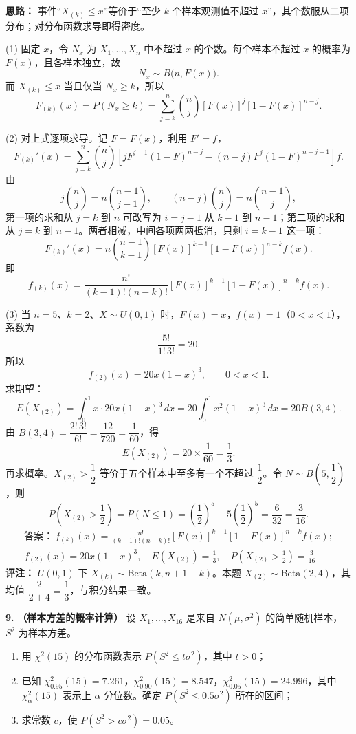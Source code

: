 \ifshowsolutions%
\textbf{思路：} 事件“$X_{(k)}\leq x$”等价于“至少 $k$ 个样本观测值不超过 $x$”，其个数服从二项分布；对分布函数求导即得密度。

(1) 固定 $x$，令 $N_x$ 为 $X_1,\ldots,X_n$ 中不超过 $x$ 的个数。每个样本不超过 $x$ 的概率为 $F(x)$，且各样本独立，故
\[
N_x\sim B\bigl(n,F(x)\bigr).
\]
而 $X_{(k)}\leq x$ 当且仅当 $N_x\geq k$，所以
\[
F_{(k)}(x)=P(N_x\geq k)
=\sum_{j=k}^{n}\binom{n}{j}[F(x)]^j[1-F(x)]^{n-j}.
\]

(2) 对上式逐项求导。记 $F=F(x)$，利用 $F'=f$，
\[
F_{(k)}'(x)=\sum_{j=k}^{n}\binom{n}{j}
\left[jF^{j-1}(1-F)^{n-j}-(n-j)F^{j}(1-F)^{n-j-1}\right]f.
\]
由
\[
j\binom{n}{j}=n\binom{n-1}{j-1},\qquad
(n-j)\binom{n}{j}=n\binom{n-1}{j},
\]
第一项的求和从 $j=k$ 到 $n$ 可改写为 $i=j-1$ 从 $k-1$ 到 $n-1$；第二项的求和从 $j=k$ 到 $n-1$。两者相减，中间各项两两抵消，只剩 $i=k-1$ 这一项：
\[
F_{(k)}'(x)=n\binom{n-1}{k-1}[F(x)]^{k-1}[1-F(x)]^{n-k}f(x).
\]
即
\[
f_{(k)}(x)=\frac{n!}{(k-1)!(n-k)!}[F(x)]^{k-1}[1-F(x)]^{n-k}f(x).
\]

(3) 当 $n=5$、$k=2$、$X\sim U(0,1)$ 时，$F(x)=x$，$f(x)=1$（$0<x<1$），系数为
\[
\frac{5!}{1!\,3!}=20.
\]
所以
\[
f_{(2)}(x)=20x(1-x)^3,\qquad 0<x<1.
\]
求期望：
\[
E(X_{(2)})=\int_0^1 x\cdot 20x(1-x)^3\,dx
=20\int_0^1 x^2(1-x)^3\,dx
=20B(3,4).
\]
由 $B(3,4)=\dfrac{2!\,3!}{6!}=\dfrac{12}{720}=\dfrac1{60}$，得
\[
E(X_{(2)})=20\times\frac1{60}=\frac13.
\]
再求概率。$X_{(2)}>\dfrac12$ 等价于五个样本中至多有一个不超过 $\dfrac12$。令 $N\sim B\!\left(5,\dfrac12\right)$，则
\[
P\!\left(X_{(2)}>\frac12\right)=P(N\leq 1)
=\left(\frac12\right)^5+5\left(\frac12\right)^5
=\frac{6}{32}=\frac{3}{16}.
\]
\[
\boxed{\begin{gathered}
\text{答案：}\ f_{(k)}(x)=\frac{n!}{(k-1)!(n-k)!}[F(x)]^{k-1}[1-F(x)]^{n-k}f(x);\\
f_{(2)}(x)=20x(1-x)^3,\quad E(X_{(2)})=\frac13,\quad P\!\left(X_{(2)}>\frac12\right)=\frac{3}{16}
\end{gathered}}
\]
\textbf{评注：} $U(0,1)$ 下 $X_{(k)}\sim\mathrm{Beta}(k,n+1-k)$。本题 $X_{(2)}\sim\mathrm{Beta}(2,4)$，其均值 $\dfrac{2}{2+4}=\dfrac13$，与积分结果一致。
\else \answerarea[10] \fi%

\textbf{9.} \textbf{（样本方差的概率计算）} 设 $X_1,\ldots,X_{16}$ 是来自 $N(\mu,\sigma^2)$ 的简单随机样本，$S^2$ 为样本方差。
\begin{enumerate}[label=(\arabic*)]
    \item 用 $\chi^2(15)$ 的分布函数表示 $P(S^2\leq t\sigma^2)$，其中 $t>0$；
    \item 已知 $\chi^2_{0.95}(15)=7.261$，$\chi^2_{0.90}(15)=8.547$，$\chi^2_{0.05}(15)=24.996$，其中 $\chi^2_{\alpha}(15)$ 表示上 $\alpha$ 分位数。确定 $P(S^2\leq 0.5\sigma^2)$ 所在的区间；
    \item 求常数 $c$，使 $P(S^2>c\sigma^2)=0.05$。
\end{enumerate}

